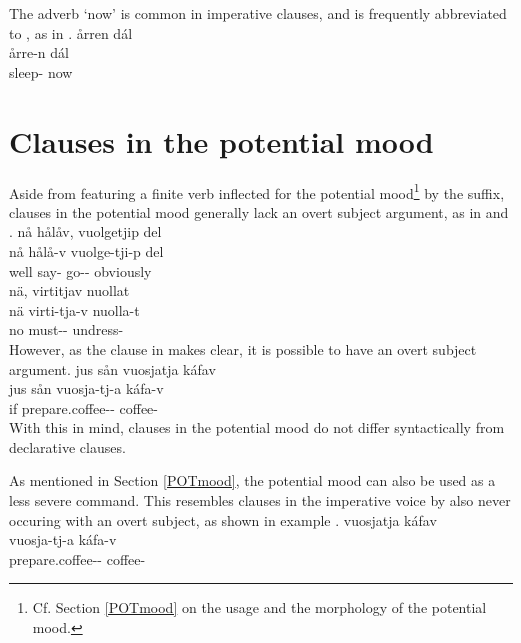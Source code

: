 The adverb  ‘now’ is common in imperative clauses, and is frequently abbreviated to , as in .
\ea\label{impClause5}
\glll	årren dál\\
	årre-n dál\\
	sleep- now\\\nopagebreak
{} 
\z


\section{Clauses in the potential mood}\label{potClauses}
Aside from featuring a finite verb inflected for the potential mood\footnote{Cf. Section \ref{POTmood} on the usage and the morphology of the potential mood.} by the  suffix, clauses in the potential mood generally lack an overt subject argument, as in %
 and . 
\ea\label{potSyntaxEx2}
\glll	nå hålåv, vuolgetjip del\\
	nå hålå-v vuolge-tji-p del\\
	well say- go-- obviously\\\nopagebreak
{}	
\z
\ea\label{potSyntaxEx3}
\glll	nä, virtitjav nuollat\\
	nä virti-tja-v nuolla-t\\
	no must-- undress-\\\nopagebreak
{}	
\z
However, as the clause in  makes clear, it is possible to have an overt subject argument. 
\ea\label{potSyntaxEx1}
\glll	jus sån vuosjatja káfav\\
	jus sån vuosja-tj-a káfa-v\\
	if  prepare.coffee-- coffee-\\\nopagebreak
{}	
\z
With this in mind, clauses in the potential mood do not differ syntactically from declarative clauses. %

As mentioned in Section \ref{POTmood}, the potential mood can also be used as a less severe command. This resembles clauses in the imperative voice by also never occuring with an overt subject, as shown %
in example . 
\ea\label{potSyntaxEx4}%
\glll	vuosjatja káfav\\
	vuosja-tj-a káfa-v\\
	prepare.coffee-- coffee-\\\nopagebreak
{}	
\z

